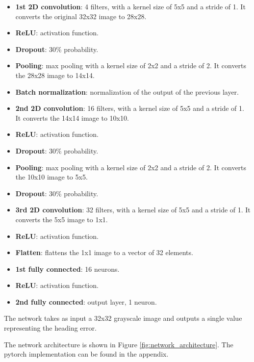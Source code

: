 \documentclass[a4paper,12pt,sort&compress]{article}
\begin{document}
    \begin{itemize} %
        \item \textbf{1st 2D convolution}: 4 filters, with a kernel size of 5x5 and a stride of 1.
        It converts the original 32x32 image to 28x28.
        \item \textbf{ReLU}: activation function.
        \item \textbf{Dropout}: 30\% probability.
        \item \textbf{Pooling}: max pooling with a kernel size of 2x2 and a stride of 2. It converts
        the 28x28 image to 14x14.
        \item \textbf{Batch normalization}: normalization of the output of the previous layer.
        \item \textbf{2nd 2D convolution}: 16 filters, with a kernel size of 5x5 and a stride of 1.
        It converts the 14x14 image to 10x10.
        \item \textbf{ReLU}: activation function.
        \item \textbf{Dropout}: 30\% probability.
        \item \textbf{Pooling}: max pooling with a kernel size of 2x2 and a stride of 2. It converts
        the 10x10 image to 5x5.
        \item \textbf{Dropout}: 30\% probability.
        \item \textbf{3rd 2D convolution}: 32 filters, with a kernel size of 5x5 and a stride of 1.
        It converts the 5x5 image to 1x1.
        \item \textbf{ReLU}: activation function.
        \item \textbf{Flatten}: flattens the 1x1 image to a vector of 32 elements.
        \item \textbf{1st fully connected}: 16 neurons.
        \item \textbf{ReLU}: activation function.
        \item \textbf{2nd fully connected}: output layer, 1 neuron.
    \end{itemize}  

    The network takes as input a 32x32 grayscale image and outputs a single value representing the heading
    error. 

    The network architecture is shown in Figure \ref{fig:network_architecture}. The pytorch
    implementation can be found in the appendix.
\end{document}
